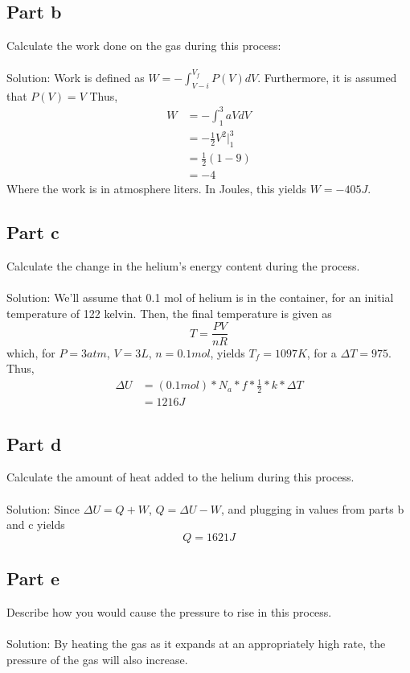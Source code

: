 \documentclass[paper=a4, fontsize=11pt]{scrartcl} %
\numberwithin{equation}{section} %
\numberwithin{figure}{section} %
\numberwithin{table}{section} %
\begin{document}
\subsection*{Part b}
Calculate the work done on the gas during this process:
\\
\\
Solution: Work is defined as $W=-\int_{V-i}^{V_f}P(V)dV$. Furthermore, it is assumed
that $P(V)=V$ Thus,
\[
\begin{aligned}
W &= -\int_1^3 aVdV\\
  &= -\frac{1}{2}V^2|_1^3\\
  &= \frac{1}{2}(1-9)\\
  &= -4
\end{aligned}
\]
Where the work is in atmosphere liters. In Joules, this yields $W=-405J$.

\subsection*{Part c}
Calculate the change in the helium's energy content during the process.
\\
\\
Solution: We'll assume that 0.1 mol of helium is in the container, for an initial temperature
of 122 kelvin. Then, the final temperature is given as
\[
T = \frac{PV}{nR}
\]
which, for $P=3atm$, $V=3L$, $n=0.1mol$, yields $T_f = 1097K$, for a $\Delta T = 975$. Thus,
\[
\begin{aligned}
\Delta U &= (0.1 mol)*N_a*f*\frac{1}{2}*k*\Delta T\\
         &= 1216J
\end{aligned}
\]

\subsection*{Part d}
Calculate the amount of heat added to the helium during this process.
\\
\\
Solution: Since $\Delta U = Q+W$, $Q=\Delta U - W$, and plugging in values from parts b and c
yields
\[
Q=1621J
\]

\subsection*{Part e}
Describe how you would cause the pressure to rise in this process.
\\
\\
Solution: By heating the gas as it expands at an appropriately high rate, the pressure of the
gas will also increase.
\end{document}
